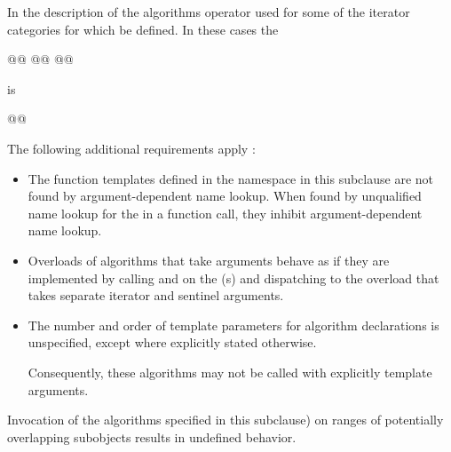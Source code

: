 \begin{addedblock}
\pnum
In the description of the algorithms operator
\tcode{-}
 used for some of the iterator categories for which
  be defined.
In these cases the 

\begin{codeblock}
@@
@@
@@
\end{codeblock}

is 

\begin{codeblock}
@@
\end{codeblock}

\pnum
{}
The following additional requirements apply :
\begin{itemize}
\item The function templates defined in the  namespace
  in this subclause are not found by argument-dependent
  name lookup. When found by
  unqualified name lookup for the
   in a function call, they
  inhibit argument-dependent name lookup.
\item Overloads of algorithms that take  arguments
  behave as if they are implemented by calling 
  and  on the (s) and dispatching to the
  overload that takes separate iterator and sentinel arguments.
\item The number and order of template parameters for algorithm declarations
  is unspecified, except where explicitly stated otherwise.
  \begin{note}
  Consequently, these algorithms may not be called with explicitly template
  arguments.
  \end{note}
\end{itemize}

\pnum
\begin{note}
Invocation of the algorithms specified in this
subclause) on ranges of
potentially overlapping subobjects
results in undefined behavior.
\end{note}


\end{addedblock}
